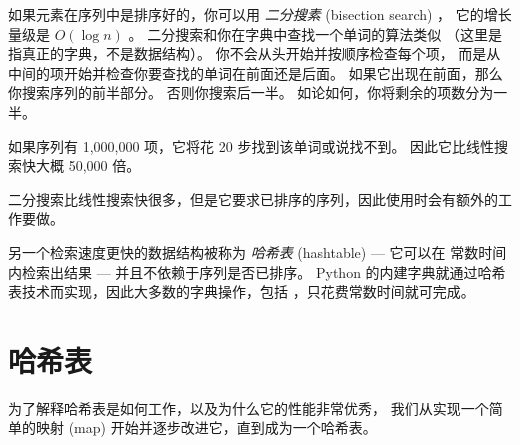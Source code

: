 如果元素在序列中是排序好的，你可以用 {\em 二分搜素} (bisection search) ，
它的增长量级是 $O(\log n)$ 。  二分搜索和你在字典中查找一个单词的算法类似
（这里是指真正的字典，不是数据结构）。 你不会从头开始并按顺序检查每个项，
而是从中间的项开始并检查你要查找的单词在前面还是后面。
如果它出现在前面，那么你搜索序列的前半部分。
否则你搜索后一半。 如论如何，你将剩余的项数分为一半。
  


如果序列有 1,000,000 项，它将花 20 步找到该单词或说找不到。
因此它比线性搜索快大概 50,000 倍。


二分搜索比线性搜索快很多，但是它要求已排序的序列，因此使用时会有额外的工作要做。


另一个检索速度更快的数据结构被称为 {\em 哈希表} (hashtable) --- 它可以在 常数时间 内检索出结果 --- 并且不依赖于序列是否已排序。 Python 的内建字典就通过哈希表技术而实现，因此大多数的字典操作，包括  ，只花费常数时间就可完成。


\section{哈希表}
\label{hashtable}


为了解释哈希表是如何工作，以及为什么它的性能非常优秀，
我们从实现一个简单的映射 (map) 开始并逐步改进它，直到成为一个哈希表。
  

